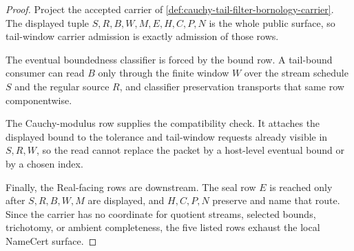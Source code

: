 \begin{proof}
Project the accepted carrier of \autoref{def:cauchy-tail-filter-bornology-carrier}. The displayed tuple $S,R,B,W,M,E,H,C,P,N$ is the whole public surface, so tail-window carrier admission is exactly admission of those rows.

The eventual boundedness classifier is forced by the bound row. A tail-bound consumer can read $B$ only through the finite window $W$ over the stream schedule $S$ and the regular source $R$, and classifier preservation transports that same row componentwise.

The Cauchy-modulus row supplies the compatibility check. It attaches the displayed bound to the tolerance and tail-window requests already visible in $S,R,W$, so the read cannot replace the packet by a host-level eventual bound or by a chosen index.

Finally, the Real-facing rows are downstream. The seal row $E$ is reached only after $S,R,B,W,M$ are displayed, and $H,C,P,N$ preserve and name that route. Since the carrier has no coordinate for quotient streams, selected bounds, trichotomy, or ambient completeness, the five listed rows exhaust the local NameCert surface.
\end{proof}




